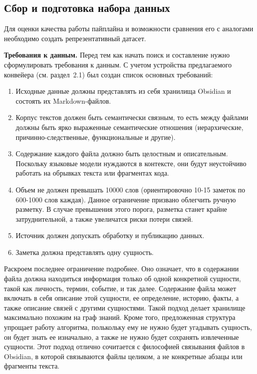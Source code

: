 \subsection{Сбор и подготовка набора данных}

Для оценки качества работы пайплайна и возможности сравнения его с аналогами необходимо создать репрезентативный датасет.

\textbf{Требования к данным.}
Перед тем как начать поиск и составление нужно сформулировать требования к данным.
С учетом устройства предлагаемого конвейера (см. раздел~2.1) был создан список основных требований:
\begin{enumerate}
      \item Исходные данные должны представлять из себя хранилища Obsidian и состоять их Markdown-файлов.
      \item Корпус текстов должен быть семантически связным,
            то есть между файлами должны быть ярко выраженные семантические отношения (иерархические, причинно-следственные, функциональные и другие).
      \item Содержание каждого файла должно быть целостным и описательным. Поскольку языковые модели нуждаются в контексте,
            они будут неустойчиво работать на обрывках текста или фрагментах кода.
      \item Объем не должен превышать 10000 слов (ориентировочно 10-15 заметок по 600-1000 слов каждая).
            Данное ограничение призвано облегчить ручную разметку.
            В случае превышения этого порога, разметка станет крайне затруднительной, а также увеличатся риски потери связей.
      \item Источник должен допускать обработку и публикацию данных.
      \item Заметка должна представлять одну сущность.
\end{enumerate}

Раскроем последнее ограничение подробнее.
Оно означает, что в содержании файла должна находиться информация только
об одной конкретной сущности, такой как личность, термин, событие, и так далее.
Содержание файла может включать в себя описание этой сущности, ее определение, историю, факты, а также описание связей с другими сущностями.
Такой подход делает хранилище максимально похожим на граф знаний.
Кроме того, предложенная структура упрощает работу алгоритма, полькольку ему не нужно будет угадывать сущность, он будет знать ее изначально,
а также не нужно будет сохранять извлеченные сущности.
Этот подход отлично сочитается с философией связывания файлов в Obsidian, в которой связываются файлы целиком,
а не конкретные абзацы или фрагменты текста.


